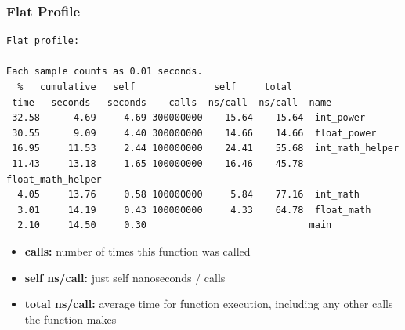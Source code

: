 \documentclass[aspectratio=43]{beamer}
\newenvironment{changemargin}[1]{%
  \begin{list}{}{%
    \setlength{\topsep}{0pt}%
    \setlength{\leftmargin}{#1}%
    \setlength{\rightmargin}{1em}
    \setlength{\listparindent}{\parindent}%
    \setlength{\itemindent}{\parindent}%
    \setlength{\parsep}{\parskip}%
  }%
  \item[]}{\end{list}}
\begin{document}
\begin{frame}[fragile]
  \frametitle{Flat Profile}

\begin{changemargin}{1cm}
  \begin{lstlisting}[basicstyle=\tiny]
Flat profile:

Each sample counts as 0.01 seconds.
  %   cumulative   self              self     total           
 time   seconds   seconds    calls  ns/call  ns/call  name    
 32.58      4.69     4.69 300000000    15.64    15.64  int_power
 30.55      9.09     4.40 300000000    14.66    14.66  float_power
 16.95     11.53     2.44 100000000    24.41    55.68  int_math_helper
 11.43     13.18     1.65 100000000    16.46    45.78  float_math_helper
  4.05     13.76     0.58 100000000     5.84    77.16  int_math
  3.01     14.19     0.43 100000000     4.33    64.78  float_math
  2.10     14.50     0.30                             main
  \end{lstlisting}


  \begin{itemize}
    \item {\bf calls:} number of times this function was called
    \item {\bf self ns/call:} just self nanoseconds / calls
    \item {\bf total ns/call:} average time for function execution, including
      any other calls the function makes
  \end{itemize}
\end{changemargin}
\end{frame}
\end{document}
